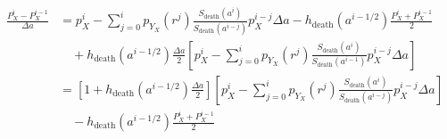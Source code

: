 \documentclass[12pt]{article}
\begin{document}
\begin{equation}
  \begin{split}
    \frac{P_X^i - P_X^{i - 1}}{\Delta a}
    &= p_X^i
    - \sum_{j = 0}^i p_{Y_X}(r^j)
    \frac{S_{\text{death}}(a^i)}{S_{\text{death}}(a^{i - j})}
    p_X^{i - j} \Delta a
    - h_{\text{death}}(a^{i - 1 / 2})
    \frac{P_X^i + P_X^{i - 1}}{2}
    \\ & \quad {}
    + h_{\text{death}}(a^{i - 1 / 2}) \frac{\Delta a}{2}
    \left[
      p_X^i
      - \sum_{j = 0}^i p_{Y_X}(r^j)
      \frac{S_{\text{death}}(a^i)}{S_{\text{death}}(a^{i - 1})}
      p_X^{i - j} \Delta a
    \right]
    \\
    &= \left[1 + h_{\text{death}}(a^{i - 1 / 2}) \frac{\Delta a}{2}\right]
    \left[p_X^i
      - \sum_{j = 0}^i p_{Y_X}(r^j)
      \frac{S_{\text{death}}(a^i)}{S_{\text{death}}(a^{i - j})}
      p_X^{i - j} \Delta a
    \right]
    \\ & \quad {}
    - h_{\text{death}}(a^{i - 1 / 2})
    \frac{P_X^i + P_X^{i - 1}}{2}
  \end{split}
\end{equation}
\end{document}
